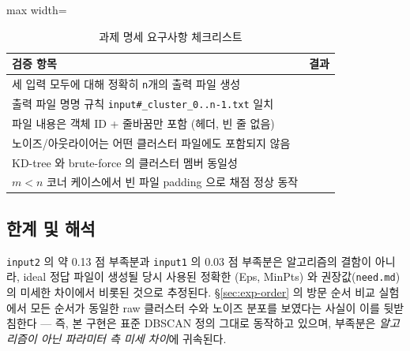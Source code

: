 \documentclass[12pt, a4paper]{article}
\newcommand{\cmark}{\ding{51}}
\begin{document}
\begin{table}[h]
\centering
\begin{adjustbox}{max width=\textwidth}
\begin{tabular}{ll}
\toprule
\textbf{검증 항목} & \textbf{결과} \\
\midrule
세 입력 모두에 대해 정확히 \texttt{n}개의 출력 파일 생성     & \cmark \\
출력 파일 명명 규칙 \texttt{input\#\_cluster\_0..n-1.txt} 일치 & \cmark \\
파일 내용은 객체 ID + 줄바꿈만 포함 (헤더, 빈 줄 없음)        & \cmark \\
노이즈/아웃라이어는 어떤 클러스터 파일에도 포함되지 않음     & \cmark \\
KD-tree 와 brute-force 의 클러스터 멤버 동일성              & \cmark \\
$m < n$ 코너 케이스에서 빈 파일 padding 으로 채점 정상 동작  & \cmark \\
\bottomrule
\end{tabular}
\end{adjustbox}
\caption{과제 명세 요구사항 체크리스트}
\end{table}

\subsection{한계 및 해석}

\texttt{input2} 의 약 0.13 점 부족분과 \texttt{input1} 의 0.03 점 부족분은 알고리즘의 결함이 아니라, ideal 정답 파일이 생성될 당시 사용된 정확한 (Eps, MinPts) 와 권장값(\texttt{need.md}) 의 미세한 차이에서 비롯된 것으로 추정된다. \S\ref{sec:exp-order} 의 방문 순서 비교 실험에서 모든 순서가 동일한 raw 클러스터 수와 노이즈 분포를 보였다는 사실이 이를 뒷받침한다 — 즉, 본 구현은 표준 DBSCAN 정의 그대로 동작하고 있으며, 부족분은 \emph{알고리즘이 아닌 파라미터 측 미세 차이}에 귀속된다.
\end{document}
